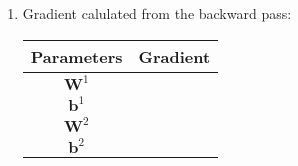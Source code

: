 \documentclass[letterpaper,11pt]{article}
\begin{document}
\begin{enumerate}
        \item Gradient calulated from the backward pass:
        
        \begin{center}
            \begin{tabular}{|c|c|}
                \hline
                Parameters & Gradient \\
                \hline
                $\textbf{W}^{1}$ &  \\
                \hline
                $\textbf{b}^{1}$ & \\
                \hline
                $\textbf{W}^{2}$ &  \\
                \hline
                $\textbf{b}^{2}$ & \\
                \hline
            \end{tabular}
        \end{center}
   \end{enumerate}
\end{document}
